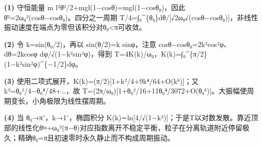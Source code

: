 \par\noindent\textbf{(1)} 守恒能量 m l²θ̇²/2+mgl(1−cosθ)=mgl(1−cosθ₀)，因此 θ̇²=2ω₀²(cosθ−cosθ₀)。四分之一周期 T/4=∫₀\textasciicircum{}\{θ₀\}dθ/[√2ω₀√(cosθ−cosθ₀)]，非线性振动速度在端点为零但该积分对θ₀<π可收敛。
\par\noindent\textbf{(2)} 令 k=sin(θ₀/2)，再以 sin(θ/2)=k sinφ，注意 cosθ−cosθ₀=2k²cos²φ、dθ=2kcosφ dφ/√(1−k²sin²φ)，得到 T=4K(k)/ω₀，K(k)=∫₀\textasciicircum{}\{π/2\}(1−k²sin²φ)\textasciicircum{}\{−1/2\}dφ。
\par\noindent\textbf{(3)} 使用二项式展开，K(k)=(π/2)[1+k²/4+9k⁴/64+O(k⁶)]；又 k²=θ₀²/4−θ₀⁴/48+…，故 T=(2π/ω₀)[1+θ₀²/16+11θ₀⁴/3072+O(θ₀⁶)]。大振幅使周期变长，小角极限为线性摆周期。
\par\noindent\textbf{(4)} 当 θ₀→π⁻，k→1⁻，椭圆积分 K(k)∼ln[4/√(1−k²)]；于是T以对数发散。靠近顶部的线性化θ̈≈+ω₀²(π−θ)对应指数离开不稳定平衡，粒子在分离轨道附近停留极久；精确θ₀=π且初速零时永久静止而不构成周期振动。
